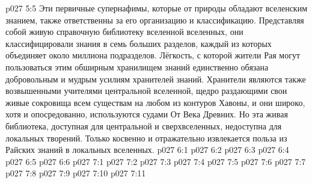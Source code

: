\vs p027 5:5 Эти первичные супернафимы, которые от природы обладают вселенским знанием, также ответственны за его организацию и классификацию. Представляя собой живую справочную библиотеку вселенной вселенных, они классифицировали знания в семь больших разделов, каждый из которых объединяет около миллиона подразделов. Лёгкость, с которой жители Рая могут пользоваться этим обширным хранилищем знаний единственно обязана добровольным и мудрым усилиям хранителей знаний. Хранители являются также возвышенными учителями центральной вселенной, щедро раздающими свои живые сокровища всем существам на любом из контуров Хавоны, и они широко, хотя и опосредованно, используются судами От Века Древних. Но эта живая библиотека, доступная для центральной и сверхвселенных, недоступна для локальных творений. Только косвенно и отражательно извлекается польза из Райских знаний в локальных вселенных.
\vs p027 6:1 
\vs p027 6:2 
\vs p027 6:3 
\vs p027 6:4 
\vs p027 6:5 
\vs p027 6:6 
\vs p027 7:1 
\vs p027 7:2 \pc 
\vs p027 7:3 
\vs p027 7:4 \pc 
\vs p027 7:5 
\vs p027 7:6 
\vs p027 7:7 
\vs p027 7:8 \pc 
\vs p027 7:9 \pc 
\vs p027 7:10 
\vsetoff
\vs p027 7:11 
\quizlink
